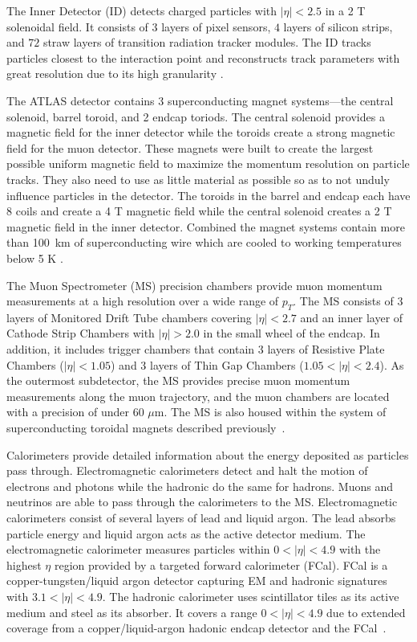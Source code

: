The Inner Detector (ID) detects charged particles with $|\eta| < 2.5$ in a 2 T solenoidal field. It consists of $3$ layers of pixel sensors, $4$ layers of silicon strips, and $72$ straw layers of transition radiation tracker modules. The ID tracks particles closest to the interaction point and reconstructs track parameters with great resolution due to its high granularity \cite{detector}. 

The ATLAS detector contains 3 superconducting magnet systems---the central solenoid, barrel toroid, and 2 endcap toriods. The central solenoid provides a magnetic field for the inner detector while the toroids create a strong magnetic field for the muon detector. These magnets were built to create the largest possible uniform magnetic field to maximize the momentum resolution on particle tracks. They also need to use as little material as possible so as to not unduly influence particles in the detector. The toroids in the barrel and endcap each have 8 coils and create a 4 T magnetic field while the central solenoid creates a 2 T magnetic field in the inner detector. Combined the magnet systems contain more than 100~km of superconducting wire which are cooled to working temperatures below 5 K \cite{detector}. 

The Muon Spectrometer (MS) precision chambers provide muon momentum measurements at a high resolution over a wide range of $p_T$. The MS consists of $3$ layers of Monitored Drift Tube chambers covering $|\eta| < 2.7$ and an inner layer of Cathode Strip Chambers with $|\eta| > 2.0$ in the small wheel of the endcap. In addition, it includes trigger chambers that contain $3$ layers of Resistive Plate Chambers ($|\eta| < 1.05$) and $3$ layers of Thin Gap Chambers ($1.05 < |\eta| < 2.4$). As the outermost subdetector, the MS provides precise muon momentum measurements along the muon trajectory, and the muon chambers are located with a precision of under $60$ $\mu$m. The MS is also housed within the system of superconducting toroidal magnets described previously~\cite{detector}. 

Calorimeters provide detailed information about the energy deposited as particles pass through. Electromagnetic calorimeters detect and halt the motion of electrons and photons while the hadronic do the same for hadrons. Muons and neutrinos are able to pass through the calorimeters to the MS. Electromagnetic calorimeters consist of several layers of lead and liquid argon. The lead absorbs particle energy and liquid argon acts as the active detector medium. The electromagnetic calorimeter measures particles within $0<|\eta|<4.9$ with the highest $\eta$ region provided by a targeted forward calorimeter (FCal). FCal is a copper-tungsten/liquid argon detector capturing EM and hadronic signatures with $3.1<|\eta|<4.9$. The hadronic calorimeter uses scintillator tiles as its active medium and steel as its absorber. It covers a range $0<|\eta|<4.9$ due to extended coverage from a copper/liquid-argon hadonic endcap detector and the FCal~\cite{detector}. 

